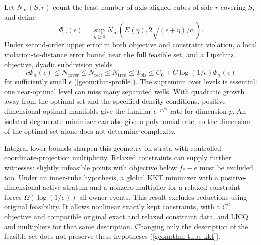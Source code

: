 Let $N_\infty(S,r)$ count the least number of axis-aligned cubes of side
$r$ covering $S$, and define
\begin{equation}\label{intro:eq-profile}
 \Phi_\alpha(\epsilon)=\sup_{\eta\geq0}
 N_\infty\!\left(E(\eta),2\sqrt{(\epsilon+\eta)/\alpha}\right).
\end{equation}
Under second-order upper error in both objective and constraint violation,
a local violation-to-distance error bound near the full feasible set, and a
Lipschitz objective, dyadic subdivision yields
\begin{equation}\label{intro:eq-comparison}
 c\Phi_\alpha(\epsilon)
 \leq N_{\mathrm{cover}}\leq N_{\mathrm{rect}}\leq N_{\mathrm{tree}}
 \leq T_{\mathrm{bis}}
 \leq C_0+C\log(1/\epsilon)\Phi_\alpha(\epsilon)
\end{equation}
for sufficiently small $\epsilon$ (\cref{geom:thm-profile}). The supremum over
levels is essential: one near-optimal level can miss many separated wells.
With quadratic growth away from the optimal set and the specified density
conditions, positive-dimensional optimal manifolds give the familiar
$\epsilon^{-p/2}$ rate for dimension $p$. An isolated degenerate minimizer
can also give a polynomial rate, so the dimension of the optimal set alone
does not determine complexity.

Integral lower bounds sharpen this geometry on strata with controlled
coordinate-projection multiplicity. Relaxed constraints can supply further
witnesses: slightly infeasible points with objective below $f_*-\epsilon$
must be excluded too. Under an inner-tube hypothesis, a global KKT minimizer
with a positive-dimensional active stratum and a nonzero multiplier for a
relaxed constraint forces $\Omega(\log(1/\epsilon))$ all-owner events. This
result excludes reductions using original feasibility. It allows nonlinear
exactly kept constraints, with a $C^2$ objective and compatible original
exact and relaxed constraint data, and LICQ and multipliers for that same
description. Changing only the description
of the feasible set does not preserve these hypotheses (\cref{geom:thm-tube-kkt}).

